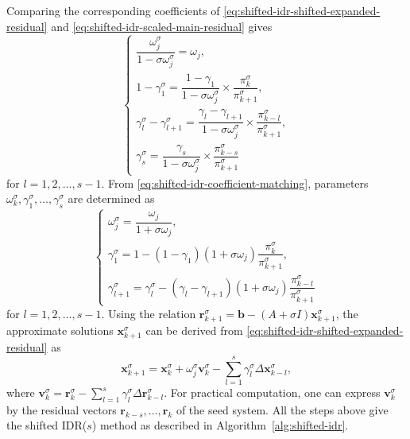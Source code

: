 {Comparing the corresponding coefficients of \eqref{eq:shifted-idr-shifted-expanded-residual} and \eqref{eq:shifted-idr-scaled-main-residual} gives}
\begin{equation}\label{eq:shifted-idr-coefficient-matching}\begin{cases}\dfrac{\omega_j^{\sigma}}{1-\sigma\omega_j^{\sigma}}=\omega_j,\\
1-\gamma_1^{\sigma}=\dfrac{1-\gamma_1}{1-\sigma\omega_j^{\sigma}}\times\dfrac{\pi_k^{\sigma}}{\pi_{k+1}^{\sigma}},\\
\gamma_l^{\sigma}-\gamma_{l+1}^{\sigma}=\dfrac{\gamma_l-\gamma_{l+1}}{1-\sigma\omega_j^{\sigma}}\times\dfrac{\pi_{k-l}^{\sigma}}{\pi_{k+1}^{\sigma}},\\
\gamma_s^{\sigma}=\dfrac{\gamma_s}{1-\sigma\omega_j^{\sigma}}\times\dfrac{\pi_{k-s}^{\sigma}}{\pi_{k+1}^{\sigma}}\end{cases}\end{equation}
{for $l=1,2,\ldots,s-1$. From \eqref{eq:shifted-idr-coefficient-matching}, parameters $\omega_k^{\sigma},\gamma_1^{\sigma},\ldots,\gamma_s^{\sigma}$ are determined as}
\begin{equation}\label{eq:shifted-idr-parameters}\begin{cases}\omega_j^{\sigma}=\dfrac{\omega_j}{1+\sigma\omega_j},\\
\gamma_1^{\sigma}=1-(1-\gamma_1)(1+\sigma\omega_j)\dfrac{\pi_k^{\sigma}}{\pi_{k+1}^{\sigma}},\\
\gamma_{l+1}^{\sigma}=\gamma_l^{\sigma}-(\gamma_l-\gamma_{l+1})(1+\sigma\omega_j)\dfrac{\pi_{k-l}^{\sigma}}{\pi_{k+1}^{\sigma}}\end{cases}\end{equation}
{for $l=1,2,\ldots,s-1$.}
{Using the relation $\bm r_{k+1}^{\sigma}=\bm b-(A+\sigma I)\bm x_{k+1}^{\sigma}$, the approximate solutions $\bm x_{k+1}^{\sigma}$ can be derived from \eqref{eq:shifted-idr-shifted-expanded-residual} as}
\begin{equation}\label{eq:shifted-idr-main-solution}\bm x_{k+1}^{\sigma}=\bm x_k^{\sigma}+\omega_j^{\sigma}\bm v_k^{\sigma}-\sum_{l=1}^{s}\gamma_l^{\sigma}\Delta\bm x_{k-l}^{\sigma},\end{equation}
{where $\bm v_k^{\sigma}=\bm r_k^{\sigma}-\sum_{l=1}^{s}\gamma_l^{\sigma}\Delta\bm r_{k-l}^{\sigma}$. For practical computation, one can express $\bm v_k^{\sigma}$ by the residual vectors $\bm r_{k-s},\ldots,\bm r_k$ of the seed system. All the steps above give the shifted IDR($s$) method as described in Algorithm\ \ref{alg:shifted-idr}.}

